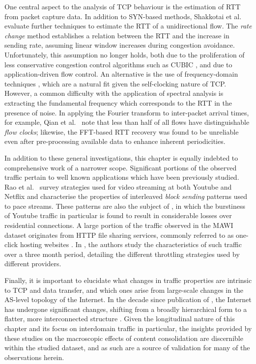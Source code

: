 One central aspect to the analysis of \ac{TCP} behaviour is the estimation of \ac{RTT} from packet capture data. 
In addition to SYN-based methods, Shakkotai et al.\ \cite{Shakkottai:2004p408} evaluate further techniques to estimate the \ac{RTT} of a unidirectional flow. 
The \textit{rate change} method establishes a relation between the \ac{RTT} and the increase in sending rate, assuming linear window increases during congestion avoidance. 
Unfortunately, this assumption no longer holds, both due to the proliferation of less conservative congestion control algorithms such as CUBIC \cite{Ha:2008p471}, and due to application-driven flow control. 
An alternative is the use of frequency-domain techniques \cite{Veal:2005p412,Lance:2005p565,Qian:2009p429}, which are a natural fit given the self-clocking nature of \ac{TCP}. 
However, a common difficulty with the application of spectral analysis is extracting the fundamental frequency which corresponds to the \ac{RTT} in the presence of noise. 
In applying the Fourier transform to inter-packet arrival times, for example, Qian et al.\ \cite{Qian:2009p429} note that less than half of all flows have distinguishable \textit{flow clocks}; likewise, the \ac{FFT}-based \ac{RTT} recovery was found to be unreliable even after pre-processing available data to enhance inherent periodicities.

In addition to these general investigations, this chapter is equally indebted to comprehensive work of a narrower scope.
Significant portions of the observed traffic pertain to well known applications which have been previously studied.
Rao et al.\ \cite{Rao:2011p547} survey strategies used for video streaming at both Youtube and Netflix and characterise the properties of interleaved \emph{block sending} patterns used to pace streams.
These patterns are also the subject of \cite{Alcock:2011p575}, in which the burstiness of Youtube traffic in particular is found to result in considerable losses over residential connections.
A large portion of the traffic observed in the \acs{MAWI} dataset originates from \ac{HTTP} file sharing services, commonly referred to as one-click hosting websites \cite{oneclick1}.
In \cite{SanjuasCuxart:2012p588}, the authors study the characteristics of such traffic over a three month period, detailing the different throttling strategies used by different providers.

Finally, it is important to elucidate what changes in traffic properties are intrinsic to \ac{TCP} and data transfer, and which ones arise from large-scale changes in the \ac{AS}-level topology of the Internet. 
In the decade since publication of \cite{Zhang:2002p85}, the Internet has undergone significant changes, shifting from a broadly hierarchical form to a flatter, more interconnected structure \cite{Labovitz:2010p175,Ager:2012p567}.
Given the longitudinal nature of this chapter and its focus on interdomain traffic in particular, the insights provided by these studies on the macroscopic effects of content consolidation are discernible within the studied dataset, and as such are a source of validation for many of the observations herein.
